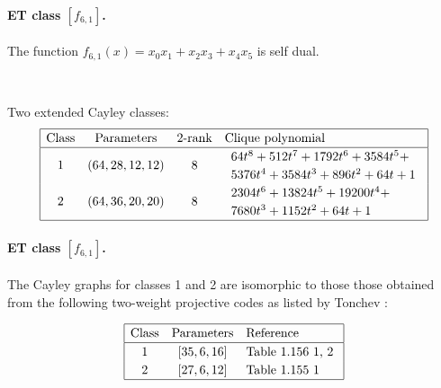 \documentclass[12pt,a4paper]{article}
\begin{document}
\paragraph*{ET class $[f_{6,1}]$.}

The function
$f_{6,1}(x) = x_0 x_1 + x_2 x_3 + x_4 x_5$ is self dual.

~

Two extended Cayley classes:
\small{}
\begin{align*}
\def\arraystretch{1.2}
\begin{array}{|cccl|}
\hline
\text{Class} &
\text{Parameters} &
\text{2-rank} &
\text{Clique polynomial}
\\
\hline
1 &
(64, 28, 12, 12) & 8 &
\begin{array}{l}
64t^{8} + 512t^{7} + 1792t^{6} + 3584t^{5} +
\\
5376t^{4} + 3584t^{3} + 896t^{2} + 64t + 1
\end{array}
\\
2 &
(64, 36, 20, 20) & 8 &
\begin{array}{l}
2304t^{6} + 13824t^{5} + 19200t^{4} +
\\
7680t^{3} + 1152t^{2} + 64t + 1
\end{array}
\\
\hline
\end{array}
\end{align*}
\paragraph*{ET class $[f_{6,1}]$.}

The Cayley graphs for classes 1 and 2 are isomorphic to those those obtained from the following
two-weight projective
codes as listed by Tonchev \cite{Ton07codes}:

\begin{align*}
\begin{array}{|ccl|}
\hline
\text{Class} &
\text{Parameters} & \text{Reference}
\\
\hline
1 & [35,6,16] & \text{Table 1.156 1, 2 }
\\
2 & [27,6,12] & \text{Table 1.155 1 }
\\
\hline
\end{array}
\end{align*}

\end{document}
